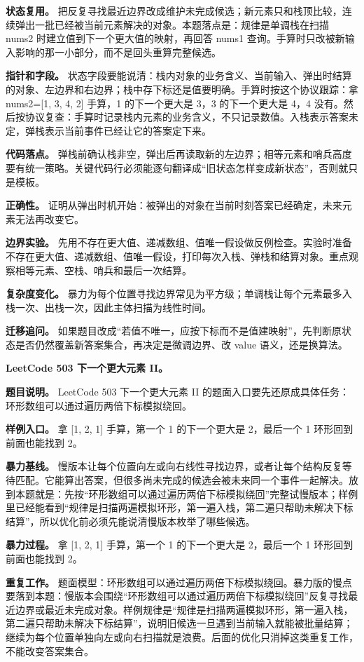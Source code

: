 \textbf{状态复用。} 把反复寻找最近边界改成维护未完成候选；新元素只和栈顶比较，连续弹出一批已经被当前元素解决的对象。本题落点是：规律是单调栈在扫描 nums2 时建立值到下一个更大值的映射，再回答 nums1 查询。手算时只改被新输入影响的那一小部分，而不是回头重算完整候选。

\textbf{指针和字段。} 状态字段要能说清：栈内对象的业务含义、当前输入、弹出时结算的对象、左边界和右边界；栈中存下标还是值要明确。手算时按这个协议跟踪：拿 nums2=[1, 3, 4, 2] 手算，1 的下一个更大是 3，3 的下一个更大是 4，4 没有。然后按协议复查：手算时记录栈内元素的业务含义，不只记录数值。入栈表示答案未定，弹栈表示当前事件已经让它的答案定下来。

\textbf{代码落点。} 弹栈前确认栈非空，弹出后再读取新的左边界；相等元素和哨兵高度要有统一策略。关键代码行必须能逐句翻译成“旧状态怎样变成新状态”，否则就只是模板。

\textbf{正确性。} 证明从弹出时机开始：被弹出的对象在当前时刻答案已经确定，未来元素无法再改变它。

\textbf{边界实验。} 先用不存在更大值、递减数组、值唯一假设做反例检查。实验时准备不存在更大值、递减数组、值唯一假设，打印每次入栈、弹栈和结算对象。重点观察相等元素、空栈、哨兵和最后一次结算。

\textbf{复杂度变化。} 暴力为每个位置寻找边界常见为平方级；单调栈让每个元素最多入栈一次、出栈一次，因此主体扫描为线性时间。

\textbf{迁移追问。} 如果题目改成“若值不唯一，应按下标而不是值建映射”，先判断原状态是否仍然覆盖新答案集合，再决定是微调边界、改 value 语义，还是换算法。

\noindent\textbf{LeetCode 503 下一个更大元素 II。}

\textbf{题目说明。} LeetCode 503 下一个更大元素 II 的题面入口要先还原成具体任务：环形数组可以通过遍历两倍下标模拟绕回。

\textbf{样例入口。} 拿 [1, 2, 1] 手算，第一个 1 的下一个更大是 2，最后一个 1 环形回到前面也能找到 2。

\textbf{暴力基线。} 慢版本让每个位置向左或向右线性寻找边界，或者让每个结构反复等待匹配。它能算出答案，但很多尚未完成的候选会被未来同一个事件一起解决。放到本题就是：先按“环形数组可以通过遍历两倍下标模拟绕回”完整试慢版本；样例里已经能看到“规律是扫描两遍模拟环形，第一遍入栈，第二遍只帮助未解决下标结算”，所以优化前必须先能说清慢版本枚举了哪些候选。

\textbf{暴力过程。} 拿 [1, 2, 1] 手算，第一个 1 的下一个更大是 2，最后一个 1 环形回到前面也能找到 2。

\textbf{重复工作。} 题面模型：环形数组可以通过遍历两倍下标模拟绕回。暴力版的慢点要落到本题：慢版本会围绕“环形数组可以通过遍历两倍下标模拟绕回”反复寻找最近边界或最近未完成对象。样例规律是“规律是扫描两遍模拟环形，第一遍入栈，第二遍只帮助未解决下标结算”，说明旧候选一旦遇到当前输入就能被批量结算；继续为每个位置单独向左或向右扫描就是浪费。后面的优化只消掉这类重复工作，不能改变答案集合。

